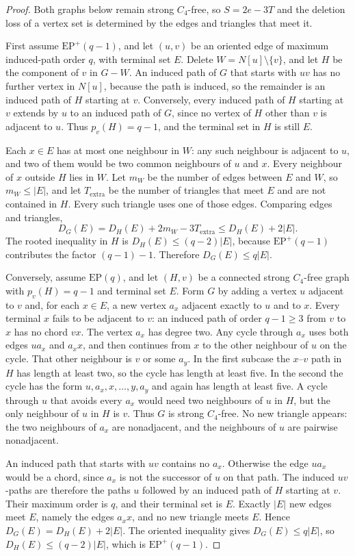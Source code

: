 \documentclass[ASNA]{USG}
\theoremstyle{WBstyletwo}
\numberwithin{equation}{section}
\newcommand{\pp}{p}
\begin{document}
\begin{proof}
Both graphs below remain strong $C_4$-free, so $S=2e-3T$ and the deletion loss of a vertex set is determined by the edges and triangles that meet it.

First assume $\mathrm{EP}^+(q-1)$, and let $(u,v)$ be an oriented edge of maximum induced-path order $q$, with terminal set $E$. Delete $W=N[u]\setminus\{v\}$, and let $H$ be the component of $v$ in $G-W$. An induced path of $G$ that starts with $uv$ has no further vertex in $N[u]$, because the path is induced, so the remainder is an induced path of $H$ starting at $v$. Conversely, every induced path of $H$ starting at $v$ extends by $u$ to an induced path of $G$, since no vertex of $H$ other than $v$ is adjacent to $u$. Thus $\pp_v(H)=q-1$, and the terminal set in $H$ is still $E$.

Each $x\in E$ has at most one neighbour in $W$: any such neighbour is adjacent to $u$, and two of them would be two common neighbours of $u$ and $x$. Every neighbour of $x$ outside $H$ lies in $W$. Let $m_W$ be the number of edges between $E$ and $W$, so $m_W\le|E|$, and let $T_{\mathrm{extra}}$ be the number of triangles that meet $E$ and are not contained in $H$. Every such triangle uses one of those edges. Comparing edges and triangles,
\[
D_G(E)=D_H(E)+2m_W-3T_{\mathrm{extra}}\le D_H(E)+2|E|.
\]
The rooted inequality in $H$ is $D_H(E)\le(q-2)|E|$, because $\mathrm{EP}^+(q-1)$ contributes the factor $(q-1)-1$. Therefore $D_G(E)\le q|E|$.

Conversely, assume $\mathrm{EP}(q)$, and let $(H,v)$ be a connected strong $C_4$-free graph with $\pp_v(H)=q-1$ and terminal set $E$. Form $G$ by adding a vertex $u$ adjacent to $v$ and, for each $x\in E$, a new vertex $a_x$ adjacent exactly to $u$ and to $x$. Every terminal $x$ fails to be adjacent to $v$: an induced path of order $q-1\ge 3$ from $v$ to $x$ has no chord $vx$. The vertex $a_x$ has degree two. Any cycle through $a_x$ uses both edges $ua_x$ and $a_xx$, and then continues from $x$ to the other neighbour of $u$ on the cycle. That other neighbour is $v$ or some $a_y$. In the first subcase the $x$--$v$ path in $H$ has length at least two, so the cycle has length at least five. In the second the cycle has the form $u,a_x,x,\dots,y,a_y$ and again has length at least five. A cycle through $u$ that avoids every $a_x$ would need two neighbours of $u$ in $H$, but the only neighbour of $u$ in $H$ is $v$. Thus $G$ is strong $C_4$-free. No new triangle appears: the two neighbours of $a_x$ are nonadjacent, and the neighbours of $u$ are pairwise nonadjacent.

An induced path that starts with $uv$ contains no $a_x$. Otherwise the edge $ua_x$ would be a chord, since $a_x$ is not the successor of $u$ on that path. The induced $uv$-paths are therefore the paths $u$ followed by an induced path of $H$ starting at $v$. Their maximum order is $q$, and their terminal set is $E$. Exactly $|E|$ new edges meet $E$, namely the edges $a_xx$, and no new triangle meets $E$. Hence $D_G(E)=D_H(E)+2|E|$. The oriented inequality gives $D_G(E)\le q|E|$, so $D_H(E)\le(q-2)|E|$, which is $\mathrm{EP}^+(q-1)$.
\end{proof}
\end{document}
